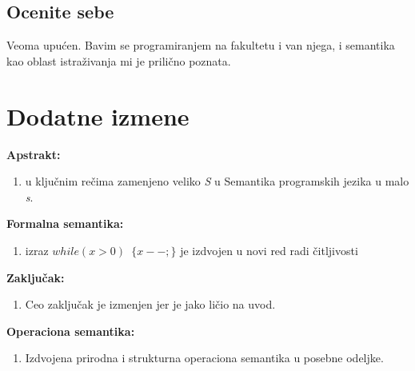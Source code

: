\documentclass[a4paper]{report}
\begin{document}
\section{Ocenite sebe}
Veoma upućen. Bavim se programiranjem na fakultetu i van njega, i semantika kao oblast istraživanja mi je prilično poznata.


\chapter{Dodatne izmene}
\textbf{Apstrakt: }
\begin{enumerate}
\item u ključnim rečima zamenjeno veliko \textit{S} u Semantika programskih jezika u malo \textit{s}.
\end{enumerate}
\textbf{Formalna semantika:}
\begin{enumerate}
\item izraz \texttt{$ while(x > 0)$  $\lbrace x--;\rbrace$} je izdvojen u novi red radi čitljivosti
\end{enumerate}
\textbf{Zaključak:}
\begin{enumerate}
\item Ceo zaključak je izmenjen jer je jako ličio na uvod.
\end{enumerate}
\textbf{Operaciona semantika:}
\begin{enumerate}
\item Izdvojena prirodna i strukturna operaciona semantika u posebne odeljke. 
\end{enumerate}
\end{document}
